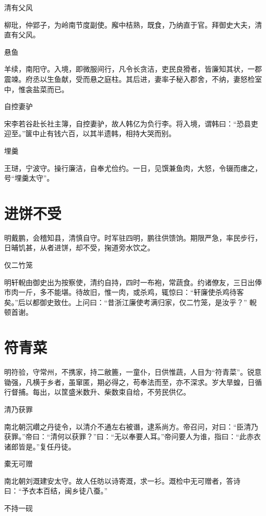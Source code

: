 \documentclass[a4paper,12pt,UTF8,twoside]{ctexbook}
\begin{document}
    清有父风
    
    柳玭，仲郢子，为岭南节度副使。廨中桔熟，既食，乃纳直于官。拜御史大夫，清直有父风。
    
    悬鱼
    
    羊续，南阳守。入境，即微服间行，凡令长贪洁，吏民良猾者，皆廉知其状，一郡震竦。府丞以生鱼献，受而悬之庭柱。其后进，妻率子秘入郡舍，不纳，妻怒检室中，惟衾盐菜而已。
    
    自控妻驴
    
    宋李若谷赴长社主簿，自控妻驴，故人韩亿为负行李。将入境，谓韩曰：“恐县吏迎至。”箧中止有钱六百，以其半遗韩，相持大哭而别。
    
    埋羹
    
    王琎，宁波守。操行廉洁，自奉尤俭约。一日，见馔兼鱼肉，大怒，令辍而瘗之，号“埋羹太守”。
    
    \section{进饼不受}
    
    明戴鹏，会稽知县，清慎自守。时军驻四明，鹏往供馈饷。期限严急，率民步行，日晡饥甚，从者进饼，却不受，掬道旁水饮之。
    
    仅二竹笼
    
    明轩輗由御史出为按察使，清约自持，四时一布袍，常蔬食。约诸僚友，三日出俸市肉一斤，多不能堪。待故旧，惟一肉，或杀鸡，辄惊曰：“轩廉使杀鸡待客矣。”后以都御史致仕。上问曰：“昔浙江廉使考满归家，仅二竹笼，是汝乎？” 輗顿首谢。
    
    \section{符青菜}
    
    明符验，守常州，不携家，持二敝簏，一童仆，日供惟蔬，人目为“符青菜”。锐意锄强，凡横于乡者，虽窜匿，期必得之，苟奉法而至，亦不深求。岁大旱蝗，日循行督捕。每出，以筐盛米数升、柴数束自给，不劳民供亿。
    
    清乃获罪
    
    南北朝沉巑之丹徒令，以清介不通左右被谮，逮系尚方。帝召问，对曰：“臣清乃获罪。”帝曰：“清何以获罪？”曰：“无以奉要人耳。”帝问要人为谁，指曰：“此赤衣诸郎皆是。”复任丹徒。
    
    橐无可赠
    
    南北朝刘溉建安太守。故人任昉以诗寄溉，求一衫。溉检中无可赠者，答诗曰：“予衣本百结，闽乡徒八蚕。”
    
    不持一砚
    
\end{document}
